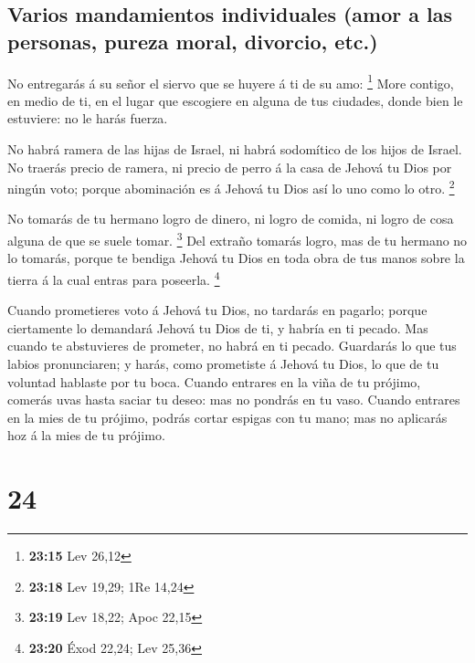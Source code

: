 \hypertarget{varios-mandamientos-individuales-amor-a-las-personas-pureza-moral-divorcio-etc.}{%
\subsection{Varios mandamientos individuales (amor a las personas,
pureza moral, divorcio,
etc.)}\label{varios-mandamientos-individuales-amor-a-las-personas-pureza-moral-divorcio-etc.}}

 No entregarás á su señor el siervo que se huyere á ti de
su amo: \footnote{\textbf{23:15} Lev 26,12}  More
contigo, en medio de ti, en el lugar que escogiere en alguna de tus
ciudades, donde bien le estuviere: no le harás fuerza.

 No habrá ramera de las hijas de Israel, ni habrá
sodomítico de los hijos de Israel.  No traerás precio de
ramera, ni precio de perro á la casa de Jehová tu Dios por ningún voto;
porque abominación es á Jehová tu Dios así lo uno como lo otro.
\footnote{\textbf{23:18} Lev 19,29; 1Re 14,24}

 No tomarás de tu hermano logro de dinero, ni logro de
comida, ni logro de cosa alguna de que se suele tomar. \footnote{\textbf{23:19}
  Lev 18,22; Apoc 22,15}  Del extraño tomarás logro, mas
de tu hermano no lo tomarás, porque te bendiga Jehová tu Dios en toda
obra de tus manos sobre la tierra á la cual entras para poseerla.
\footnote{\textbf{23:20} Éxod 22,24; Lev 25,36}

 Cuando prometieres voto á Jehová tu Dios, no tardarás en
pagarlo; porque ciertamente lo demandará Jehová tu Dios de ti, y habría
en ti pecado.  Mas cuando te abstuvieres de prometer, no
habrá en ti pecado.  Guardarás lo que tus labios
pronunciaren; y harás, como prometiste á Jehová tu Dios, lo que de tu
voluntad hablaste por tu boca.  Cuando entrares en la
viña de tu prójimo, comerás uvas hasta saciar tu deseo: mas no pondrás
en tu vaso.  Cuando entrares en la mies de tu prójimo,
podrás cortar espigas con tu mano; mas no aplicarás hoz á la mies de tu
prójimo.

\hypertarget{section-23}{%
\section{24}\label{section-23}}

